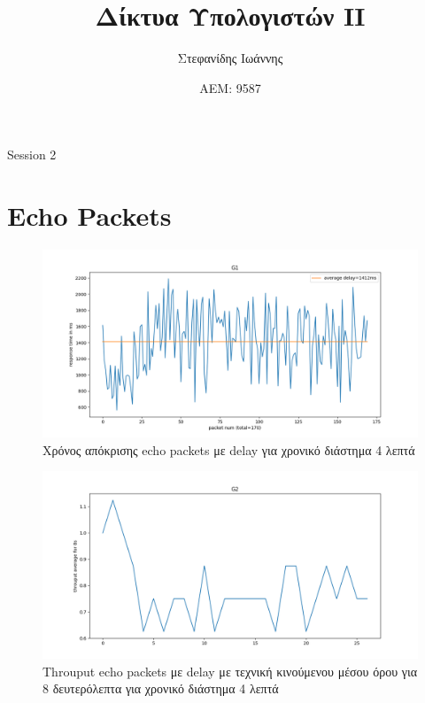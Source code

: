 \documentclass{article}
\author{Στεφανίδης Ιωάννης}
\title{Δίκτυα Υπολογιστών ΙΙ}
\date{ΑΕΜ: 9587}
\begin{document}
\maketitle

\begin{center}
  \huge Session 2
\end{center}

\section{Echo Packets}

\begin{figure}[H]
  \begin{center}
    \includegraphics[width=\textwidth]{G1.png}
  \end{center}
  \caption{Χρόνος απόκρισης echo packets με delay για χρονικό διάστημα 4 λεπτά}
\end{figure}

\begin{figure}[H]
  \begin{center}
    \includegraphics[width=\textwidth]{G2.png}
  \end{center}
  \caption{Throuput echo packets με delay με τεχνική κινούμενου μέσου όρου για 8
  δευτερόλεπτα για χρονικό διάστημα 4 λεπτά}
\end{figure}
\end{document}
